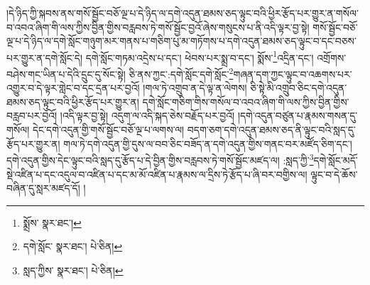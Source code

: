 །དེ་ཉིད་ཀྱི་སྐབས་ནས་གསོ་སྦྱོང་བཅོ་ལྔ་པ་དེ་ཉིད་ལ་དགེ་འདུན་ཐམས་ཅད་ལྟུང་བའི་ཕྱིར་རྩོད་པར་གྱུར་ན་གསོལ་བ་འབའ་ཞིག་གི་ལས་ཀྱིས་བྱིན་གྱིས་བརླབས་ཏེ་གསོ་སྦྱོང་བྱའོ་ཞེས་གསུངས་པ་ནི་འདི་ལྟར་བྱ་སྟེ། གསོ་སྦྱོང་བཅོ་ལྔ་པ་དེ་ཉིད་ལ་དགེ་སློང་གཉུག་མར་གནས་པ་གཅིག་པུ་མ་གཏོགས་པ་དགེ་འདུན་ཐམས་ཅད་ལྟུང་བ་དང་བཅས་པར་གྱུར་ན་དགེ་སློང་དེ། དགེ་སློང་གཏམ་འདྲེས་པ་དང་། ཕེབས་པར་སྨྲ་བ་དང་། སྨོས་\footnote{སྨྲོས་  སྣར་ཐང་། }འདྲིན་དང་། འགྲོགས་བཤེས་གང་ཡིན་པ་དེའི་དྲུང་དུ་སོང་སྟེ། ཅི་ནས་ཀྱང་:དགེ་སློང་དགེ་སློང་\footnote{དགེ་སློང་  སྣར་ཐང་།  པེ་ཅིན། }གཞན་དག་ཀྱང་ལྟུང་བ་འཆགས་པར་འགྱུར་བ་དེ་ལྟར་གླེང་བ་དང་དྲན་པར་བྱའོ། །གལ་ཏེ་འགྲུབ་ན་དེ་ལྟ་ན་ལེགས། ཅི་སྟེ་མི་འགྲུབ་ཅིང་དགེ་འདུན་ཐམས་ཅད་ལྟུང་བའི་ཕྱིར་རྩོད་པར་གྱུར་ན། དགེ་སློང་གཅིག་གིས་གསོལ་བ་འབའ་ཞིག་གི་ལས་ཀྱིས་བྱིན་གྱིས་བརླབ་པར་བྱའོ། །འདི་ལྟར་བྱ་སྟེ། འདུག་ལ་འདི་སྐད་ཅེས་བརྗོད་པར་བྱའོ། །དགེ་འདུན་བཙུན་པ་རྣམས་གསན་དུ་གསོལ། དེང་དགེ་འདུན་གྱི་གསོ་སྦྱོང་བཅོ་ལྔ་པ་ལགས་ལ། བདག་ཅག་དགེ་འདུན་ཐམས་ཅད་ནི་ལྟུང་བའི་སླད་དུ་རྩོད་པར་གྱུར་ན། གལ་ཏེ་དགེ་འདུན་གྱི་དུས་ལ་བབ་ཅིང་བཟོད་ན་དགེ་འདུན་གྱིས་གནང་བར་མཛོད་ཅིག་དང་། དགེ་འདུན་གྱིས་དེང་ལྟུང་བའི་སླད་དུ་རྩོད་པ་དེ་བྱིན་གྱིས་བརླབས་ཏེ་གསོ་སྦྱོང་མཛད་ལ། :སླད་ཀྱི་\footnote{སླད་ཀྱིས་  སྣར་ཐང་།  པེ་ཅིན། }དགེ་སློང་མདོ་སྡེ་འཛིན་པ་དང་འདུལ་བ་འཛིན་པ་དང་མ་མོ་འཛིན་པ་རྣམས་ལ་དྲིས་ཏེ་རྩོད་པ་ཞི་བར་བགྱིས་ལ། ལྟུང་བ་དེ་ཆོས་བཞིན་དུ་སླར་མཛད་དོ། །
